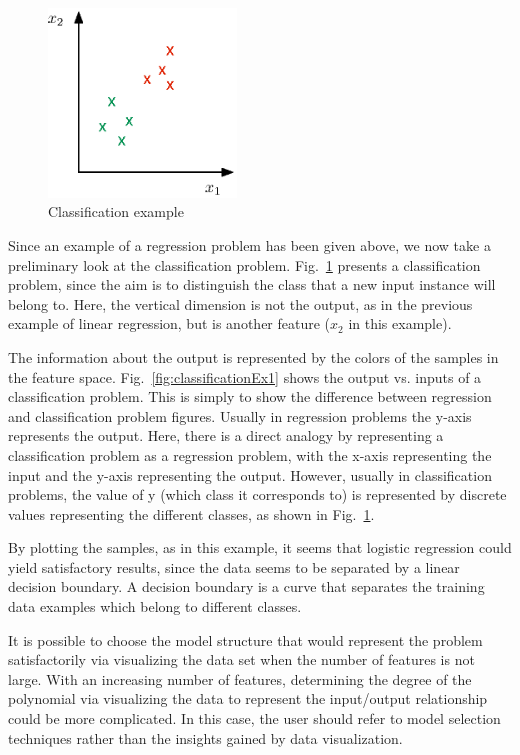 \begin{figure}
\begin{center}
\includegraphics[width=5cm]{figures/classificationEx2}    %
\caption{Classification example} 
\label{fig:classificationEx2}
\end{center}
\end{figure}

Since an example of a regression problem has been given above, we now take a preliminary look at the classification problem. 
Fig.~\ref{fig:classificationEx2} presents a classification problem, since the aim is to distinguish the class that a new input instance will belong to. 
Here, the vertical dimension is not the output, as in the previous example of linear regression, but is another feature ($x_2$ in this example). 

The information about the output is represented by the colors of the samples in the feature space.
Fig.~\ref{fig:classificationEx1} shows the output vs. inputs of a classification problem. 
This is simply to show the difference between regression and classification problem figures. 
Usually in regression problems the y-axis represents the output. 
Here, there is a direct analogy by representing a classification problem as a regression problem, with the x-axis representing the input and the y-axis representing the output. 
However, usually in classification problems, the value of y (which class it corresponds to) is represented by discrete values representing the different classes, as shown in Fig.~\ref{fig:classificationEx2}.

By plotting the samples, as in this example, it seems that logistic regression could yield satisfactory results, since the data seems to be separated by a linear decision boundary. 
A decision boundary is a curve that separates the training data examples which belong to different classes. 

It is possible to choose the model structure that would represent the problem satisfactorily via visualizing the data set when the number of features is not large.
With an increasing number of features, determining the degree of the polynomial via visualizing the data to represent the input/output relationship could be more complicated. 
In this case, the user should refer to model selection techniques rather than the insights gained by data visualization. 

